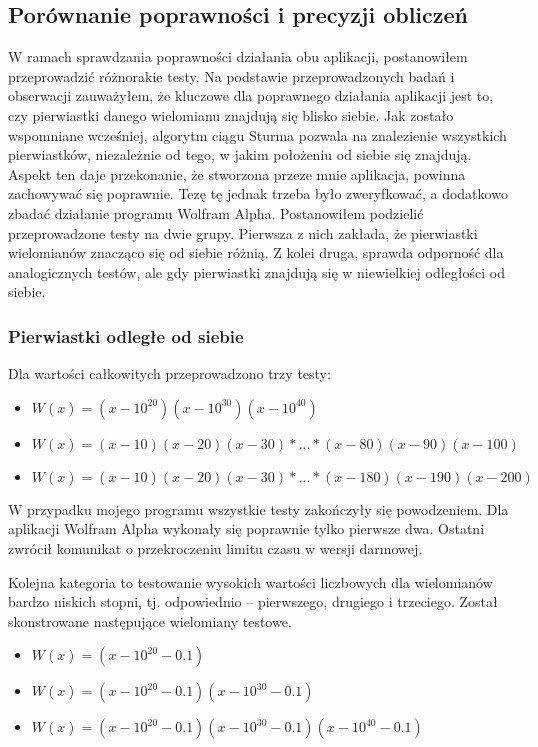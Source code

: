\documentclass[oneside,a4paper]{book}
\begin{document}
	\subsection {Porównanie poprawności i precyzji obliczeń}
	
	W ramach sprawdzania poprawności działania obu aplikacji, postanowiłem przeprowadzić różnorakie testy. Na podstawie przeprowadzonych badań i obserwacji zauważyłem, że kluczowe dla poprawnego działania aplikacji jest to, czy pierwiastki danego wielomianu znajdują się blisko siebie. Jak zostało wspomniane wcześniej, algorytm ciągu Sturma pozwala na znalezienie wszystkich pierwiastków, niezależnie od tego, w jakim położeniu od siebie się znajdują. Aspekt ten daje przekonanie, że stworzona przeze mnie aplikacja, powinna zachowywać się poprawnie. Tezę tę jednak trzeba było zweryfkować, a dodatkowo zbadać działanie programu Wolfram Alpha. Postanowiłem podzielić przeprowadzone testy na dwie grupy. Pierwsza z nich zakłada, że pierwiastki wielomianów znacząco się od siebie różnią. Z kolei druga, sprawda odporność dla analogicznych testów, ale gdy pierwiastki znajdują się w niewielkiej odległości od siebie.
	
	\subsubsection {Pierwiastki odległe od siebie}
	
	Dla wartości całkowitych przeprowadzono trzy testy:
	\begin{itemize}
		\item $W(x)=(x-10^{20})(x-10^{30})(x-10^{40})$
		\item $W(x)=(x-10)(x-20)(x-30)*...*(x-80)(x-90)(x-100)$
		\item $W(x)=(x-10)(x-20)(x-30)*...*(x-180)(x-190)(x-200)$
	\end{itemize}
	
	W przypadku mojego programu wszystkie testy zakończyły się powodzeniem. Dla aplikacji Wolfram Alpha wykonały się poprawnie tylko pierwsze dwa. Ostatni zwrócił komunikat o przekroczeniu limitu czasu w wersji darmowej.
	
	Kolejna kategoria to testowanie wysokich wartości liczbowych dla wielomianów bardzo niskich stopni, tj. odpowiednio -- pierwszego, drugiego i trzeciego. Został skonstrowane następujące wielomiany testowe.
	\begin{itemize}
		\item $W(x)=(x-10^{20}-0.1)$
		\item $W(x)=(x-10^{20}-0.1)(x-10^{30}-0.1)$
		\item $W(x)=(x-10^{20}-0.1)(x-10^{30}-0.1)(x-10^{40}-0.1)$
	\end{itemize}
	
\end{document}
